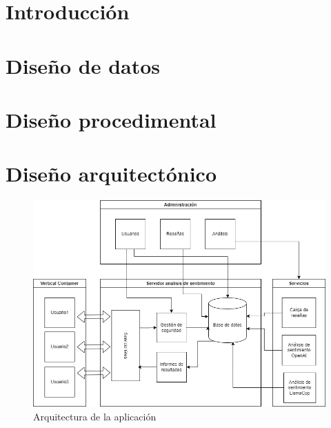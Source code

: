 
\section{Introducción}

\section{Diseño de datos}

\section{Diseño procedimental}

\section{Diseño arquitectónico}

\begin{figure}
    \includegraphics[width=\linewidth]{img/Arquitectura de la aplicación.png}
    \caption{Arquitectura de la aplicación}
    \label{fig:arq1}
\end{figure}
